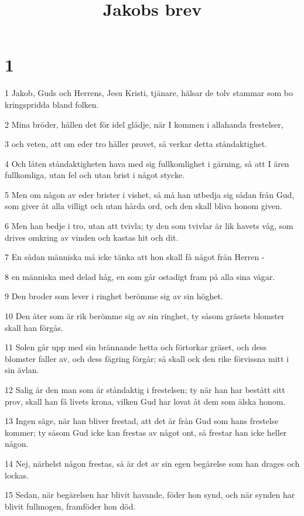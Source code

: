 

\title{Jakobs brev}


\chapter{1}

\par 1 Jakob, Guds och Herrens, Jesu Kristi, tjänare, hälsar de tolv stammar som bo kringspridda bland folken.
\par 2 Mina bröder, hållen det för idel glädje, när I kommen i allahanda frestelser,
\par 3 och veten, att om eder tro håller provet, så verkar detta ståndaktighet.
\par 4 Och låten ståndaktigheten hava med sig fullkomlighet i gärning, så att I ären fullkomliga, utan fel och utan brist i något stycke.
\par 5 Men om någon av eder brister i vishet, så må han utbedja sig sådan från Gud, som giver åt alla villigt och utan hårda ord, och den skall bliva honom given.
\par 6 Men han bedje i tro, utan att tvivla; ty den som tvivlar är lik havets våg, som drives omkring av vinden och kastas hit och dit.
\par 7 En sådan människa må icke tänka att hon skall få något från Herren -
\par 8 en människa med delad håg, en som går ostadigt fram på alla sina vägar.
\par 9 Den broder som lever i ringhet berömme sig av sin höghet.
\par 10 Den åter som är rik berömme sig av sin ringhet, ty såsom gräsets blomster skall han förgås.
\par 11 Solen går upp med sin brännande hetta och förtorkar gräset, och dess blomster faller av, och dess fägring förgår; så skall ock den rike förvissna mitt i sin ävlan.
\par 12 Salig är den man som är ståndaktig i frestelsen; ty när han har bestått sitt prov, skall han få livets krona, vilken Gud har lovat åt dem som älska honom.
\par 13 Ingen säge, när han bliver frestad, att det är från Gud som hans frestelse kommer; ty såsom Gud icke kan frestas av något ont, så frestar han icke heller någon.
\par 14 Nej, närhelst någon frestas, så är det av sin egen begärelse som han drages och lockas.
\par 15 Sedan, när begärelsen har blivit havande, föder hon synd, och när synden har blivit fullmogen, framföder hon död.
